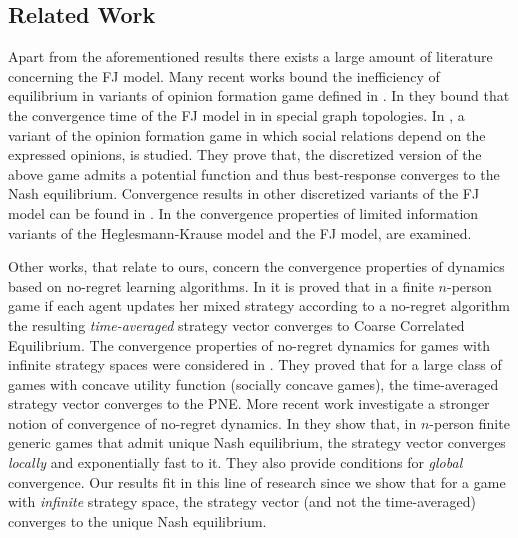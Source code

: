 \subsection{Related Work}

Apart from the aforementioned results there exists a large amount of literature
concerning the FJ model.  Many recent works \cite{BGM13,CKO13,BFM16,EFHS17}
bound the inefficiency of equilibrium in variants of opinion formation game
defined in \cite{BKO11}. In \cite{GS14} they bound that the convergence time of
the FJ model in in special graph topologies.  In \cite{BFM16}, a variant of the
opinion formation game in which social relations depend on the expressed
opinions, is studied.  They prove that, the discretized version of the above
game admits a potential function and thus best-response converges to the Nash
equilibrium. Convergence results in other discretized variants of the FJ model
can be found in \cite{YOASS13,FGV16}. In \cite{FPS16} the convergence
properties of limited information variants of the Heglesmann-Krause model
\cite{HK} and the FJ model, are examined.

Other works, that relate to ours, concern the convergence properties of
dynamics based on no-regret learning algorithms.  In
\cite{FV97,FS99,SA00,SALS15} it is proved that in a finite $n$-person game if
each agent updates her mixed strategy according to a no-regret algorithm the
resulting \emph{time-averaged} strategy vector converges to Coarse Correlated
Equilibrium. The convergence properties of no-regret dynamics for games with
infinite strategy spaces were considered in \cite{EMN09}.  They proved that for
a large class of games with concave utility function (socially concave games),
the time-averaged strategy vector converges to the PNE. More recent work
investigate a stronger notion of convergence of no-regret dynamics. In
\cite{CHM17} they show that, in $n$-person finite generic games that admit
unique Nash equilibrium, the strategy vector converges \emph{locally} and
exponentially fast to it. They also provide conditions for \emph{global}
convergence.  Our results fit in this line of research since we show that for a
game with \emph{infinite} strategy space, the strategy vector (and not the
time-averaged) converges to the unique Nash equilibrium.

